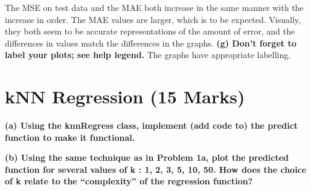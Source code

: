 \documentclass[]{scrreprt}   %
\begin{document}
{The MSE on test data and the MAE both increase in the same manner with the increase in order. The MAE values are larger, which is to be expected. Visually, they both seem to be accurate representations of the amount of error, and the differences in values match the differences in the  graphs.}
\bigbreak
\textbf{(g) Don’t forget to label your plots; see help legend.}
{The graphs have appropriate labelling.}

\section{kNN Regression (15 Marks)}
\textbf{(a) Using the knnRegress class, implement (add code to) the predict function to make it functional.}


\bigbreak
\textbf{(b) Using the same technique as in Problem 1a, plot the predicted function for several values of k : 1, 2, 3, 5, 10, 50. How does the choice of k relate to the “complexity” of the regression function?}
\end{document}
